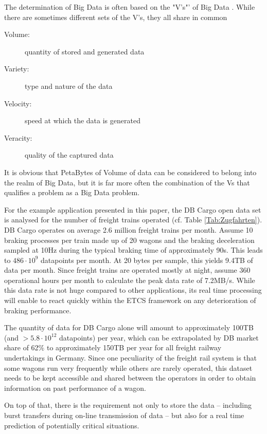 \documentclass[a4paper, 12pt]{scrartcl}
\begin{document}
The determination of Big Data is often based on the "V's"' of Big Data \cite{hilbert2016big, Eadline2016}. While there are sometimes different sets of the V's, they all share in common
\begin{description}
	\item[Volume:] quantity of stored and generated data 
	\item[Variety:] type and nature of the data
	\item[Velocity:] speed at which the data is generated
	\item[Veracity:] quality of the captured data
\end{description}
It is obvious that PetaBytes of Volume of data can be considered to belong into the realm of Big Data, but it is far more often the combination of the Vs that qualifies a problem as a Big Data problem.

For the example application presented in this paper, the DB Cargo open data set \cite{DBOpenDataZug} is analysed for the number of freight trains operated (cf. Table \ref{Tab:Zugfahrten}). DB Cargo operates on average 2.6 million freight trains per month. Assume 10 braking processes per train made up of 20 wagons and the braking deceleration sampled at 10Hz during the typical braking time of approximately 90s. This leads to $486\cdot 10^9$ datapoints per month. At 20 bytes per sample, this yields 9.4TB of data per month. Since freight trains are operated mostly at night, assume 360 operational hours per month to calculate the peak data rate of 7.2MB/s. While this data rate is not huge compared to other applications, its real time processing will enable to react quickly within the ETCS framework on any deterioration of braking performance.

The quantity of data for DB Cargo alone will amount to approximately 100TB (and $>5.8\cdot 10^{12}$ datapoints) per year, which can be extrapolated by DB market share of 62\% to approximately 150TB per year for all freight railway undertakings in Germany. Since one peculiarity of the freight rail system is that some wagons run very frequently while others are rarely operated, this dataset needs to be kept accessible and shared between the operators in order to obtain  information on past performance of a wagon.

On top of that, there is the requirement not only to store the data -- including burst transfers during on-line transmission of data -- but also for a real time prediction of potentially critical situations.
\end{document}
